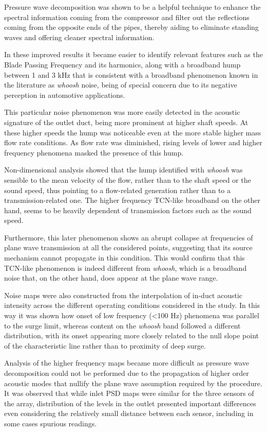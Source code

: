 Pressure wave decomposition was shown to be a helpful technique to enhance the spectral information coming from the compressor and filter out the reflections coming from the opposite ends of the pipes, thereby aiding to eliminate standing waves and offering  cleaner spectral information.

In these improved results it became easier to identify relevant features such as the Blade Passing Frequency and its harmonics, along with a broadband hump between 1 and 3 kHz that is consistent with a broadband phenomenon known in the literature as \emph{whoosh} noise, being of special concern due to its negative perception in automotive applications.

This particular noise phenomenon was more easily detected in the acoustic signature of the outlet duct, being more prominent at higher shaft speeds. At these higher speeds the hump was noticeable even at the more stable higher mass flow rate conditions. As flow rate was diminished, rising levels of lower and higher frequency phenomena masked the presence of this hump. 

Non-dimensional analysis showed that the hump identified with \emph{whoosh} was sensible to the mean velocity of the flow, rather than to the shaft speed or the sound speed, thus pointing to a flow-related generation rather than to a transmission-related one. The higher frequency TCN-like broadband on the other hand, seems to be heavily dependent of transmission factors such as the sound speed. 

Furthermore, this later phenomenon shows an abrupt collapse at frequencies of plane wave transmission at all the considered points, suggesting that its source mechanism cannot propagate in this condition. This would confirm that this TCN-like phenomenon is indeed different from \emph{whoosh}, which is a broadband noise that, on the other hand, does appear at the plane wave range.

Noise maps were also constructed from the interpolation of in-duct acoustic intensity across the different operating conditions considered in the study. In this way it was shown how onset of low frequency (<100 Hz) phenomena was parallel to the surge limit, whereas content on the \emph{whoosh} band followed a different distribution, with its onset appearing more closely related to the null slope point of the characteristic line rather than to proximity of deep surge.

Analysis of the higher frequency maps became more difficult as pressure wave decomposition could not be performed due to the propagation of higher order acoustic modes that nullify the plane wave assumption required by the procedure. It was observed that while inlet PSD maps were similar for the three sensors of the array, distribution of the levels in the outlet presented important differences even considering the relatively small distance between each sensor, including in some cases spurious readings. 

